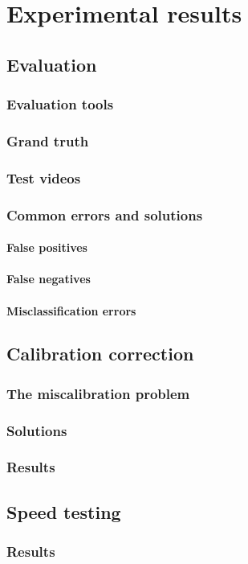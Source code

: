 \chapter{Experimental results}\label{chap:Tests}
\section{Evaluation}

\subsection{Evaluation tools}
\subsection{Grand truth}
\subsection{Test videos}

\subsection{Common errors and solutions}
\subsubsection{False positives}
\subsubsection{False negatives}
\subsubsection{Misclassification errors}

\section{Calibration correction}

\subsection{The miscalibration problem}
\subsection{Solutions}
\subsection{Results}

\section{Speed testing}

\subsection{Results}
